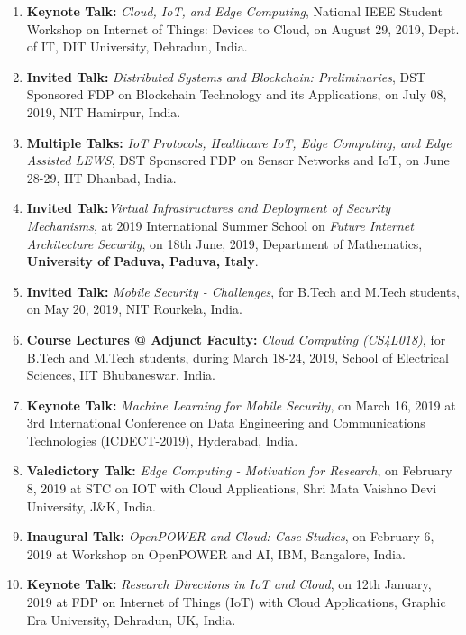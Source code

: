 \begin{enumerate}
\item
\textbf{Keynote Talk:} \textit{Cloud, IoT, and Edge Computing}, National IEEE Student Workshop on Internet of Things: Devices to Cloud, on August 29, 2019, Dept. of IT, DIT University, Dehradun, India.

\item
\textbf{Invited Talk:} \textit{Distributed Systems and Blockchain: Preliminaries}, DST Sponsored FDP on Blockchain Technology and its Applications, on July 08, 2019, NIT Hamirpur, India.

\item
\textbf{Multiple Talks:} \textit{IoT Protocols, Healthcare IoT, Edge Computing, and Edge Assisted LEWS}, DST Sponsored FDP on Sensor Networks and IoT, on June 28-29, IIT Dhanbad, India.

\item
\textbf{Invited Talk:}\textit{Virtual Infrastructures and Deployment of Security Mechanisms}, at 2019 International Summer School on \textit{Future Internet Architecture Security}, on 18th June, 2019, Department of Mathematics, \textbf{University of Paduva, Paduva, Italy}.

\item
\textbf{Invited Talk:} \textit{Mobile Security - Challenges}, for B.Tech and M.Tech students, on May 20, 2019, NIT Rourkela, India.

\item
\textbf{Course Lectures @ Adjunct Faculty:} \textit{Cloud Computing (CS4L018)}, for B.Tech and M.Tech students, during March 18-24, 2019, School of Electrical Sciences, IIT Bhubaneswar, India.

\item
\textbf{Keynote Talk:} \textit{Machine Learning for Mobile Security}, on March 16, 2019 at 3rd International Conference on Data Engineering and Communications Technologies (ICDECT-2019), Hyderabad, India.

\item
\textbf{Valedictory Talk:} \textit{Edge Computing - Motivation for Research}, on February 8, 2019 at STC on IOT with Cloud Applications, Shri Mata Vaishno Devi University, J\&K, India.

\item
\textbf{Inaugural Talk:} \textit{OpenPOWER and Cloud: Case Studies}, on February 6, 2019 at Workshop on OpenPOWER and AI, IBM, Bangalore, India.

\item
\textbf{Keynote Talk:} \textit{Research Directions in IoT and Cloud}, on 12th January, 2019 at FDP on Internet of Things (IoT) with Cloud Applications, Graphic Era University, Dehradun, UK, India.


\end{enumerate}
